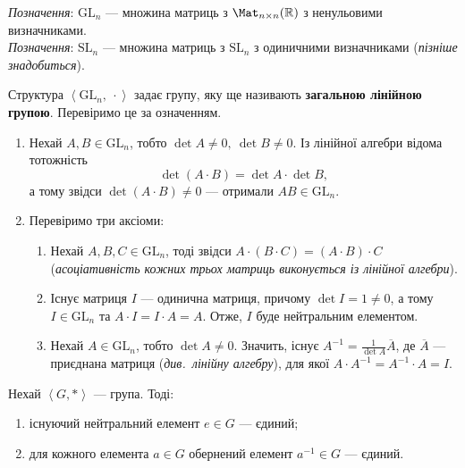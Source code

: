 \documentclass{math_library}
\begin{document}
\textit{Позначення}: $\mathrm{GL}_n$ --- множина матриць з $\Mat_{n \times n}(\mathbb{R})$ з ненульовими визначниками.\\
\textit{Позначення}: $\mathrm{SL}_n$ --- множина матриць з $\mathrm{SL}_n$ з одиничними визначниками (\textit{пізніше знадобиться}).

\begin{example}
Структура $\left< \mathrm{GL}_n,\ \cdot \right>$ задає групу, яку ще називають \textbf{загальною лінійною групою}. Перевіримо це за означенням.

\begin{enumerate}[wide=0pt,label={\Roman*)}]
\item Нехай $A,B \in \mathrm{GL}_n$, тобто $\det A \neq 0,\ \det B \neq 0$. Із лінійної алгебри відома тотожність \[
\det (A \cdot B) = \det A \cdot \det B,
\] а тому звідси $\det (A \cdot B) \neq 0$ --- отримали $AB \in \mathrm{GL}_n$.

\item Перевіримо три аксіоми:
\begin{enumerate}[nosep,label={\arabic*)}]
\item Нехай $A,B,C \in \mathrm{GL}_n$, тоді звідси $A \cdot (B \cdot C) = (A \cdot B) \cdot C$ (\textit{асоціативність кожних трьох матриць виконується із лінійної алгебри}).
\item Існує матриця $I$ --- одинична матриця, причому $\det I = 1 \neq 0$, а тому $I \in \mathrm{GL}_n$ та $A \cdot I = I \cdot A = A$. Отже, $I$ буде нейтральним елементом.
\item Нехай $A \in \mathrm{GL}_n$, тобто $\det A \neq 0$. Значить, існує $A^{-1} = \frac{1}{\det A} \overline{A}$, де $\overline{A}$ --- приєднана матриця (\textit{див.~лінійну алгебру}), для якої $A \cdot A^{-1} = A^{-1} \cdot A = I$.
\end{enumerate}
\end{enumerate}
\end{example}

\begin{proposition}
Нехай $\left<G,* \right>$ --- група. Тоді:
\begin{enumerate}[nosep,wide=0pt, label={\arabic*)}]
\item існуючий нейтральний елемент $e \in G$ --- єдиний;
\item для кожного елемента $a \in G$ обернений елемент $a^{-1} \in G$ --- єдиний.
\end{enumerate}
\end{proposition}
\end{document}
